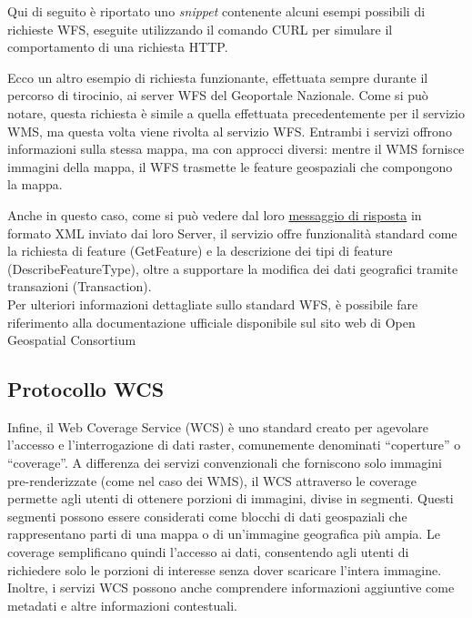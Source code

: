 Qui di seguito è riportato uno \textit{snippet} contenente alcuni esempi possibili di richieste WFS, eseguite utilizzando il comando CURL per simulare il comportamento di una richiesta HTTP.

\lstset{basicstyle=\footnotesize\ttfamily}

Ecco un altro esempio di richiesta funzionante, effettuata sempre durante il percorso di tirocinio, ai server WFS del Geoportale Nazionale.
Come si può notare, questa richiesta è simile a quella effettuata precedentemente per il servizio WMS, ma questa volta viene rivolta al servizio WFS. Entrambi i servizi offrono informazioni sulla stessa mappa, ma con approcci diversi: mentre il WMS fornisce immagini della mappa, il WFS trasmette le feature geospaziali che compongono la mappa.

\lstset{basicstyle=\footnotesize\ttfamily}

Anche in questo caso, come si può vedere dal loro \href{http://wms.pcn.minambiente.it/ogc?map=/ms_ogc/wfs/Alluvioni_Estensione.map&service=wfs&request=getCapabilities}{messaggio di risposta} in formato XML inviato dai loro Server,
il servizio offre funzionalità standard come la richiesta di feature (GetFeature) e la descrizione dei tipi di feature (DescribeFeatureType), oltre a supportare la modifica dei dati geografici tramite transazioni (Transaction).
\\Per ulteriori informazioni dettagliate sullo standard WFS, è possibile fare riferimento alla documentazione ufficiale disponibile sul sito web di Open Geospatial Consortium \cite{DocumentazioneWMS}

\subsection{Protocollo WCS}

Infine, il Web Coverage Service (WCS) è uno standard creato per agevolare l'accesso e l'interrogazione di dati raster, comunemente denominati ``coperture'' o ``coverage''.
A differenza dei servizi convenzionali che forniscono solo immagini pre-renderizzate (come nel caso dei WMS), il WCS attraverso le coverage permette agli utenti di ottenere porzioni di immagini, divise in segmenti. Questi segmenti possono essere considerati come blocchi di dati geospaziali che rappresentano parti di una mappa o di un'immagine geografica più ampia. Le coverage semplificano quindi l'accesso ai dati, consentendo agli utenti di richiedere solo le porzioni di interesse senza dover scaricare l'intera immagine.
\\Inoltre, i servizi WCS possono anche comprendere informazioni aggiuntive come metadati e altre informazioni contestuali.

